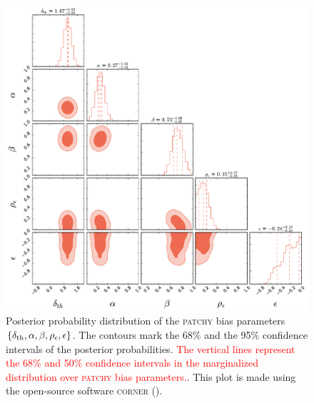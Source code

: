 \documentclass[english,usenatbib]{mn2e}
\newcommand{\tod}[1]{{\textcolor{red}{ #1}}}
\begin{document}
\begin{figure}
\includegraphics[width=2\columnwidth]{posterior}
\caption{\label{fig:bias} Posterior probability distribution of the \textsc{patchy} bias parameters $\{\delta_{\rm th},\alpha,\beta,\rho_{\epsilon},\epsilon\}$. The contours mark the 68$\%$ and the 95$\%$ confidence intervals of the posterior probabilities. \tod{The vertical lines represent the 68$\%$ and 50$\%$ confidence intervals in the marginalized distribution over \textsc{patchy} bias parameters.}. This plot is made using the open-source software \textsc{corner} (\citealt{corner}).}
\end{figure}
\end{document}
